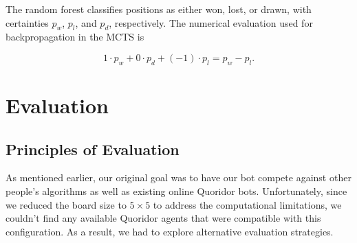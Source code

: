 \documentclass[10pt]{article}
\begin{document}
The random forest classifies positions as either won, lost, or drawn, with certainties $p_w$, $p_l$, and $p_d$, respectively. The numerical evaluation used for backpropagation in the MCTS is 

\begin{equation}
    1 \cdot p_w + 0 \cdot p_d + (-1) \cdot p_l = p_w - p_l.
\end{equation} 


\section{Evaluation}

\subsection{Principles of Evaluation}

As mentioned earlier, our original goal was to have our bot compete against other people's algorithms as well as existing online Quoridor bots. Unfortunately, since we reduced the board size to $5 \times 5$ to address the computational limitations, we couldn't find any available Quoridor agents that were compatible with this configuration. As a result, we had to explore alternative evaluation strategies.
\end{document}
